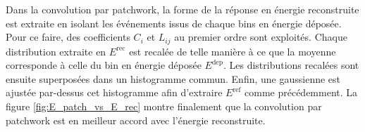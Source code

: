  Dans la convolution par patchwork, la forme de la réponse en énergie reconstruite est extraite en isolant les événements issus de chaque bins en énergie déposée. Pour ce faire, des coefficients $C_i$ et $L_{ij}$ au premier ordre sont exploités. Chaque distribution extraite en $E^\textrm{rec}$ est recalée de telle manière à ce que la moyenne corresponde à celle du bin en énergie déposée $E^\textrm{dep}$. Les distributions recalées sont ensuite superposées dans un histogramme commun. Enfin, une gaussienne est ajustée par-dessus cet histogramme afin d'extraire $E^{\textrm{ref}}$ comme précédemment. La figure \ref{fig:E_patch_vs_E_rec} montre finalement que la convolution par patchwork est en meilleur accord avec l'énergie reconstruite.\\

